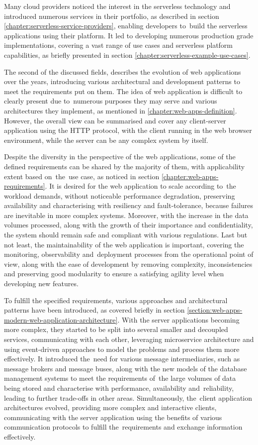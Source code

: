 Many cloud providers noticed the interest in the serverless technology and introduced numerous services in their portfolio, as described in section \ref{chapter:serverless-service-providers}, enabling developers to~build the serverless applications using their platform.
It led to developing numerous production grade implementations, covering a vast range of use cases and serverless platform capabilities, as briefly presented in section \ref{chapter:serverless-example-use-cases}.

The second of the discussed fields, describes the evolution of web applications over the years, introducing various architectural and development patterns to meet the requirements put on them.
The idea of web application is difficult to clearly present due to~numerous purposes they may serve and various architectures they implement, as mentioned in \ref{chapter:web-apps-definition}. However, the overall view can be summarised and cover any client-server application using the HTTP protocol, with the client running in the web browser environment, while the server can be any complex system by itself.

Despite the diversity in the perspective of the web applications, some of the defined requirements can be shared by the majority of them, with applicability extent based on~the~use case, as noticed in section \ref{chapter:web-apps-requirements}.
It is desired for the web application to scale according to~the workload demands, without noticeable performance degradation, preserving availability and characterising with resiliency and fault-tolerance, because failures are inevitable in more complex systems. Moreover, with the increase in the data volumes processed, along with the growth of their importance and confidentiality, the system should remain safe and compliant with various regulations. Last but not least, the maintainability of the web application is important, covering the monitoring, observability and~deployment processes from the operational point of view, along with the ease of development by removing complexity, inconsistencies and preserving good modularity to ensure a satisfying agility level when developing new features.

To fulfill the specified requirements, various approaches and architectural patterns have been introduced, as covered briefly in section \ref{section:web-apps-modern-web-application-architecture}.
With the server applications becoming more complex, they started to be split into several smaller and decoupled services, communicating with each other, leveraging microservice architecture and using event-driven approaches to model the problems and process them more effectively.
It introduced the~need for various message intermediaries, such as message brokers and message buses, along with the new models of the database management systems to meet the requirements of~the large volumes of data being stored and characterise with performance, availability and~reliability, leading to further trade-offs in other areas.
Simultaneously, the~client application architectures evolved, providing more complex and interactive clients, communicating with the server application using the benefits of various communication protocols to fulfill the~requirements and exchange information effectively.

